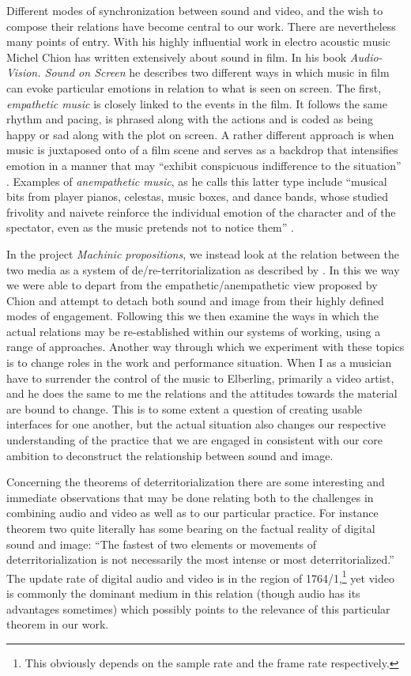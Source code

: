 \documentclass[11pt]{article}
\begin{document}
Different modes of synchronization between sound and video, and the wish to compose their
relations have become central to our work. There are nevertheless many
points of entry. With his highly influential work in electro acoustic music
Michel Chion has written extensively about sound in film. In his book \emph{Audio-Vision. Sound on
  Screen} he describes two different ways in which music in film can
evoke particular emotions in relation to what is seen on screen. The
first, \emph{empathetic music} is closely linked to the events in the
film. It follows the same rhythm and pacing, is phrased along with the
actions and is coded as being happy or sad along with the plot on
screen. A rather different approach is when music is juxtaposed onto
of a film scene and serves as a backdrop that intensifies emotion in a
manner that may ``exhibit conspicuous indifference to the situation''
\citep[p. 8]{Chion1994}. Examples of \emph{anempathetic music}, as he
calls this latter type include ``musical bits from player pianos,
celestas, music boxes, and dance bands, whose studied frivolity and
naivete reinforce the individual emotion of the character and of the
spectator, even as the music pretends not to notice them''
\citep[p. 8]{Chion1994}.

In the project \emph{Machinic propositions}, we instead look at the
relation between the two media as a system of de/re-territorialization
as described by \citet{deleuze80}. In this we way we were able to
depart from the empathetic/anempathetic view proposed by Chion and
attempt to detach both sound and image from their highly defined modes
of engagement. Following this we then examine the ways in which the
actual relations may be re-established within our systems of working,
using a range of approaches. Another way through which we experiment with
these topics is to change roles in the work and performance
situation. When I as a musician have to surrender the
control of the music to Elberling, primarily a video artist, and he
does the same to me the relations and the attitudes towards the
material are bound to change. This is to some extent a question
of creating usable interfaces for one another, but the actual
situation also changes our respective understanding of the practice
that we are engaged in consistent with our core ambition to
deconstruct the relationship between sound and image.

Concerning the theorems of deterritorialization there are some
interesting and immediate observations that may be done relating both
to the challenges in combining audio and video as well as to our
particular practice. For instance theorem two quite literally has
some bearing on the factual reality of digital sound and image: ``The
fastest of two elements or movements of deterritorialization is not
necessarily the most intense or most deterritorialized.''
\citep[p. 193]{deleuze80} The update rate of digital audio and video
is in the region of 1764/1,\footnote{This obviously depends on the
  sample rate and the frame rate respectively.} yet video is commonly the dominant medium
in this relation (though audio has its advantages sometimes) which
possibly points to the relevance of this particular theorem in our work.
\end{document}
